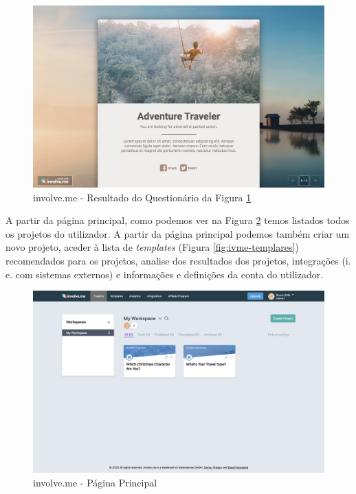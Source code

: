 \begin{figure}[ht!]
	\begin{center}
		\includegraphics[width=1\textwidth]{img/ivme/x2}
		\caption{involve.me - Resultado do Questionário da Figura \ref{fig:ivme-x2}}
		\label{fig:ivme-x2}
	\end{center}
\end{figure}

\pagebreak

A partir da página principal, como podemos ver na Figura \ref{fig:ivme-dash} temos listados todos os projetos do utilizador. A partir da página principal podemos também criar um novo projeto, aceder à lista de \textit{templates} (Figura \ref{fig:ivme-templares}) recomendados para os projetos, analise dos resultados dos projetos, integrações (i. e. com sistemas externos) e informações e definições da conta do utilizador. 

\begin{figure}[ht!]
	\begin{center}
		\includegraphics[width=1\textwidth]{img/ivme/dashboard}
		\caption{involve.me - Página Principal}
		\label{fig:ivme-dash}
	\end{center}
\end{figure}

